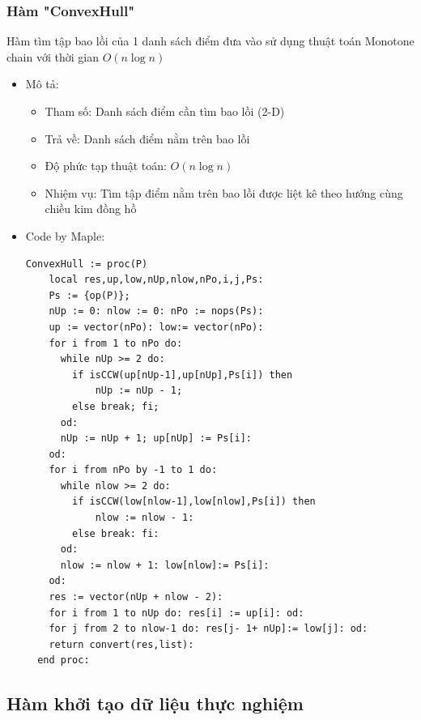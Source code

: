 \documentclass[12pt]{article}
\begin{document}
      \subsubsection{Hàm "ConvexHull"}
        Hàm tìm tập bao lồi của 1 danh sách điểm đưa vào sử dụng thuật toán Monotone chain với thời gian $O(n \log n)$
        \begin{itemize}
          \item Mô tả:
          \begin{itemize}
            \item Tham số: Danh sách điểm cần tìm bao lồi (2-D)
            \item Trả về: Danh sách điểm nằm trên bao lồi 
            \item Độ phức tạp thuật toán: $O(n\log n)$
            \item Nhiệm vụ: Tìm tập điểm nằm trên bao lồi được liệt kê theo hướng cùng chiều kim đồng hồ
          \end{itemize}
        \item Code by Maple:
        \begin{Verbatim}[frame=single]
  ConvexHull := proc(P)
    local res,up,low,nUp,nlow,nPo,i,j,Ps:
    Ps := {op(P)};
    nUp := 0: nlow := 0: nPo := nops(Ps):
    up := vector(nPo): low:= vector(nPo):
    for i from 1 to nPo do:
      while nUp >= 2 do:
        if isCCW(up[nUp-1],up[nUp],Ps[i]) then 
        	nUp := nUp - 1;
        else break; fi;
      od:
      nUp := nUp + 1; up[nUp] := Ps[i]:
    od:
    for i from nPo by -1 to 1 do:
      while nlow >= 2 do:
        if isCCW(low[nlow-1],low[nlow],Ps[i]) then 
        	nlow := nlow - 1:
        else break: fi:
      od:
      nlow := nlow + 1: low[nlow]:= Ps[i]:
    od:
    res := vector(nUp + nlow - 2):
    for i from 1 to nUp do: res[i] := up[i]: od:
    for j from 2 to nlow-1 do: res[j- 1+ nUp]:= low[j]: od:
    return convert(res,list):
  end proc:
        \end{Verbatim}
      \end{itemize}
        \newpage
    \subsection{Hàm khởi tạo dữ liệu thực nghiệm}
\end{document}
